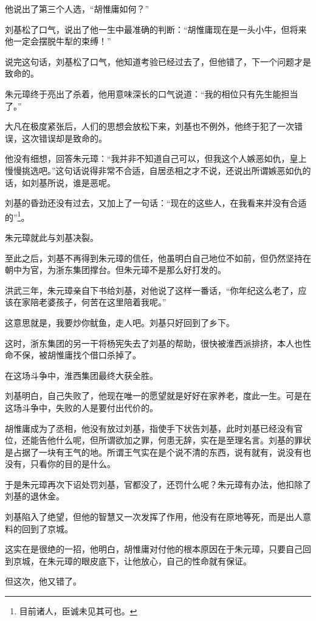 \begin{multicols}{\theparacolNo}
		他说出了第三个人选，“胡惟庸如何？”

		刘基松了口气，说出了他一生中最准确的判断：“胡惟庸现在是一头小牛，但将来他一定会摆脱牛犁的束缚！”

		说完这句话，刘基松了口气，他知道考验已经过去了，但他错了，下一个问题才是致命的。

		朱元璋终于亮出了杀着，他用意味深长的口气说道：“我的相位只有先生能担当了。”

		大凡在极度紧张后，人们的思想会放松下来，刘基也不例外，他终于犯了一次错误，这次错误却是致命的。

		他没有细想，回答朱元璋：“我并非不知道自己可以，但我这个人嫉恶如仇，皇上慢慢挑选吧。”这句话说得非常不合适，自居丞相之才不说，还说出所谓嫉恶如仇的话，如刘基所说，谁是恶呢。

		刘基的昏劲还没有过去，又加上了一句话：“现在的这些人，在我看来并没有合适的”\footnote{目前诸人，臣诚未见其可也。}。

		朱元璋就此与刘基决裂。

		至此之后，刘基不再得到朱元璋的信任，他虽明白自己地位不如前，但仍然坚持在朝中为官，为浙东集团撑台。但朱元璋不是那么好打发的。

		洪武三年，朱元璋亲自下书给刘基，对他说了这样一番话，“你年纪这么老了，应该在家陪老婆孩子，何苦在这里陪着我呢。”

		这意思就是，我要炒你鱿鱼，走人吧。刘基只好回到了乡下。

		这时，浙东集团的另一干将杨宪失去了刘基的帮助，很快被淮西派排挤，本人也性命不保，被胡惟庸找个借口杀掉了。

		在这场斗争中，淮西集团最终大获全胜。

		刘基明白，自己失败了，他现在唯一的愿望就是好好在家养老，度此一生。可是在这场斗争中，失败的人是要付出代价的。

		胡惟庸成为了丞相，他没有放过刘基，指使手下状告刘基，此时刘基已经没有官位，还能告他什么呢，但所谓欲加之罪，何患无辞，实在是至理名言。刘基的罪状是占据了一块有王气的地。所谓王气实在是个说不清的东西，说有就有，说没有也没有，只看你的目的是什么。

		于是朱元璋再次下诏处罚刘基，官都没了，还罚什么呢？朱元璋有办法，他扣除了刘基的退休金。

		刘基陷入了绝望，但他的智慧又一次发挥了作用，他没有在原地等死，而是出人意料的回到了京城。

		这实在是很绝的一招，他明白，胡惟庸对付他的根本原因在于朱元璋，只要自己回到京城，在朱元璋的眼皮底下，让他放心，自己的性命就有保证。

		但这次，他又错了。


\end{multicols}
